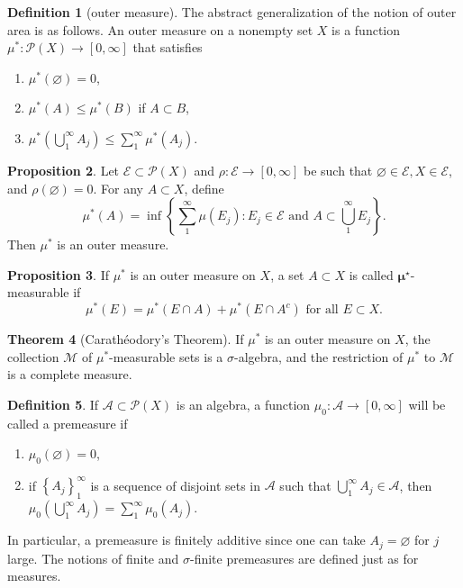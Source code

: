 \documentclass[12pt,a4paper]{book}
\newenvironment{enu}{\begin{enumerate}[(1)]}{\end{enumerate}}
\theoremstyle{definition}
\newtheorem{defn}{Definition}[section]
\newtheorem{theo}[defn]{Theorem}
\newtheorem{prop}[defn]{Proposition}
\begin{document}
\begin{defn}[outer measure]
    The abstract generalization of the notion of outer area is as follows. An outer measure on a nonempty set $X$ is a function $\mu^*: \mathcal{P}(X) \rightarrow[0, \infty]$ that satisfies
    \begin{enu}
        \item $\mu^*(\varnothing)=0$,
        \item $\mu^*(A) \leq \mu^*(B)$ if $A \subset B$,
        \item $\mu^*\left(\bigcup_1^{\infty} A_j\right) \leq \sum_1^{\infty} \mu^*\left(A_j\right)$.
    \end{enu}
    \label{proposition:induce a outer measure}
\end{defn}
\begin{prop}
    Let $\mathcal{E} \subset \mathcal{P}(X)$ and $\rho: \mathcal{E} \rightarrow[0, \infty]$ be such that $\varnothing \in \mathcal{E}, X \in \mathcal{E}$, and $\rho(\varnothing)=0$.
    For any $A \subset X$, define
    $$
        \mu^*(A)=\inf \left\{\sum_1^{\infty} \mu\left(E_j\right): E_j \in \mathcal{E} \text { and } A \subset \bigcup_1^{\infty} E_j\right\} .
    $$
    Then $\mu^*$ is an outer measure.
\end{prop}
\begin{prop}
    If $\mu^*$ is an outer measure on $X$, a set $A \subset X$ is called $\boldsymbol{\mu}^{\star}$-measurable if
    $$
        \mu^*(E)=\mu^*(E \cap A)+\mu^*\left(E \cap A^c\right) \text { for all } E \subset X .
    $$
\end{prop}
\begin{theo}[Carathéodory's Theorem]
    If $\mu^*$ is an outer measure on $X$, the collection $\mathcal{M}$ of $\mu^*$-measurable sets is a $\sigma$-algebra, and the restriction of $\mu^*$ to $\mathcal{M}$ is a complete measure.
\end{theo}
\begin{defn}
    If $\mathcal{A} \subset \mathcal{P}(X)$ is an algebra, a function $\mu_0: \mathcal{A} \rightarrow[0, \infty]$ will be called a premeasure if
    \begin{enu}
        \item $\mu_0(\varnothing)=0$,
        \item if $\left\{A_j\right\}_1^{\infty}$ is a sequence of disjoint sets in $\mathcal{A}$ such that $\bigcup_1^{\infty} A_j \in \mathcal{A}$, then $\mu_0\left(\bigcup_1^{\infty} A_j\right)=\sum_1^{\infty} \mu_0\left(A_j\right)$.
    \end{enu}
    In particular, a premeasure is finitely additive since one can take $A_j=\varnothing$ for $j$ large. The notions of finite and $\sigma$-finite premeasures are defined just as for measures.
\end{defn}
\end{document}
